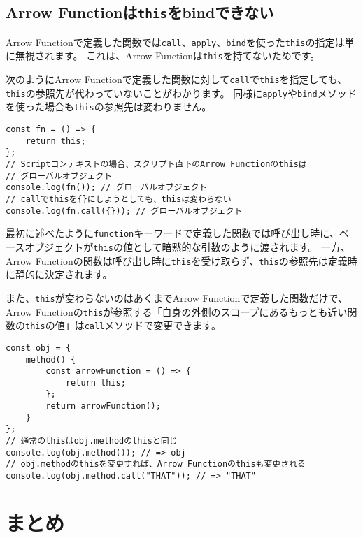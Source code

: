 \hypertarget{not-bind-arrow-function}{%
\subsection{\texorpdfstring{Arrow
Functionは\texttt{this}をbindできない}{Arrow Functionはthisをbindできない}}\label{not-bind-arrow-function}}

Arrow
Functionで定義した関数では\texttt{call}、\texttt{apply}、\texttt{bind}を使った\texttt{this}の指定は単に無視されます。
これは、Arrow
Functionは\texttt{this}を持てないためです。

次のようにArrow
Functionで定義した関数に対して\texttt{call}で\texttt{this}を指定しても、\texttt{this}の参照先が代わっていないことがわかります。
同様に\texttt{apply}や\texttt{bind}メソッドを使った場合も\texttt{this}の参照先は変わりません。

\begin{lstlisting}
const fn = () => {
    return this;
};
// Scriptコンテキストの場合、スクリプト直下のArrow Functionのthisは
// グローバルオブジェクト
console.log(fn()); // グローバルオブジェクト
// callでthisを{}にしようとしても、thisは変わらない
console.log(fn.call({})); // グローバルオブジェクト
\end{lstlisting}

最初に述べたように\texttt{function}キーワードで定義した関数では呼び出し時に、ベースオブジェクトが\texttt{this}の値として暗黙的な引数のように渡されます。
一方、Arrow
Functionの関数は呼び出し時に\texttt{this}を受け取らず、\texttt{this}の参照先は定義時に静的に決定されます。

また、\texttt{this}が変わらないのはあくまでArrow
Functionで定義した関数だけで、Arrow
Functionの\texttt{this}が参照する「自身の外側のスコープにあるもっとも近い関数の\texttt{this}の値」は\texttt{call}メソッドで変更できます。

\begin{lstlisting}
const obj = {
    method() {
        const arrowFunction = () => {
            return this;
        };
        return arrowFunction();
    }
};
// 通常のthisはobj.methodのthisと同じ
console.log(obj.method()); // => obj
// obj.methodのthisを変更すれば、Arrow Functionのthisも変更される
console.log(obj.method.call("THAT")); // => "THAT"
\end{lstlisting}
\newpage
\hypertarget{conclusion}{%
\section{まとめ}\label{conclusion}}

